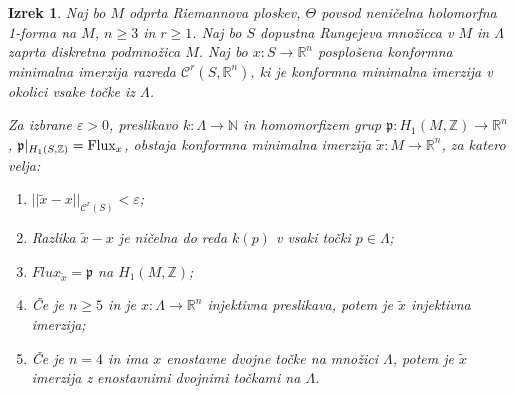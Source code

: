 \documentclass[12pt,a4paper,twoside]{article}
\newcommand{\literatura}{literatura}  %
\theoremstyle{definition} %
\theoremstyle{plain} %
\newtheorem{izrek}[definicija]{Izrek}
\numberwithin{equation}{section}  %
\newcommand{\R}{\mathbb R}
\newcommand{\N}{\mathbb N}
\newcommand{\Z}{\mathbb Z}
\begin{document}
\begin{izrek}
Naj bo $M$ odprta Riemannova ploskev, $\Theta$ povsod neničelna holomorfna 1-forma na $M$, $n \geq 3$ in $r \geq 1$.
Naj bo $S$ dopustna Rungejeva množicca v $M$ in $\Lambda$ zaprta diskretna podmnožica $M$. 
Naj bo $x \colon S \to \R^{n}$ posplošena konformna minimalna imerzija razreda $\mathcal{C}^{r}(S, \R^{n})$, ki je konformna minimalna imerzija v okolici vsake točke iz $\Lambda$.

Za izbrane $\varepsilon > 0$, preslikavo $k \colon \Lambda \to \N$ in homomorfizem grup $\mathfrak{p} \colon H_{1}(M,\Z) \to \R^{n}$, $\mathfrak{p}|_{H_{1}(S,\Z)} = \textup{Flux}_{x}$, obstaja konformna minimalna imerzija $\tilde{x} \colon M \to \R^{n}$, za katero velja:
\begin{enumerate}
\item $||\tilde{x} - x||_{\mathcal{C}^{r}(S)} < \varepsilon$;
\item Razlika $\tilde{x}-x$ je ničelna do reda $k(p)$ v vsaki točki $p\in \Lambda$;
\item $Flux_{\tilde{x}} = \mathfrak{p}$ na $H_{1}(M,\Z)$;
\item Če je $n\geq5$ in je $x \colon \Lambda \to \R^{n}$ injektivna preslikava, potem je $\tilde{x}$ injektivna imerzija;
\item Če je $n=4$ in ima $x$ enostavne dvojne točke na množici $\Lambda$, potem je $\tilde{x}$ imerzija z enostavnimi dvojnimi točkami na $\Lambda$.
\end{enumerate}
\end{izrek}

\cleardoublepage                           %

\cleardoublepage                           %
\printindex
\end{document}
